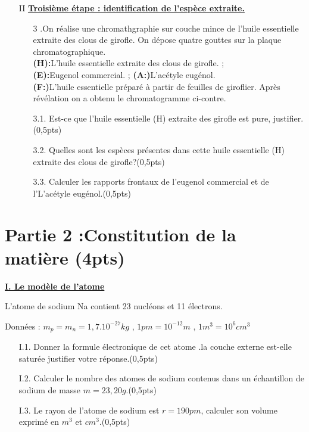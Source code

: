 \documentclass[12pt]{article}
\begin{document}
\begin{enumerate}
\begin{enumerate}
		\end{enumerate}
	\item[II] \underline{\textbf{Troisième étape : identification de l’espèce extraite.}}



		\begin{enumerate}
			\item[3].On réalise une chromathgraphie sur couche mince de l’huile essentielle extraite des clous de girofle. On
dépose quatre gouttes sur la plaque chromatographique.\\\textbf{(H):}L’huile essentielle extraite des clous de girofle. ; 
\\\textbf{(E):}Eugenol commercial. ; \textbf{(A:)}L’acétyle eugénol.
\\\textbf{(F:)}L’huile essentielle préparé à partir de feuilles de giroflier.
Après révélation on a obtenu le chromatogramme ci-contre.

\item[3.1.]Est-ce que l’huile essentielle (H) extraite des girofle est pure, justifier.\dotfill(0,5pts)
\item[3.2.]Quelles sont les espèces présentes dans cette huile essentielle (H) extraite des clous de girofle?\dotfill(0,5pts)

\item[3.3.]Calculer les rapports frontaux de l’eugenol commercial et de l’L’acétyle
eugénol.\dotfill(0,5pts) 
		\end{enumerate}
\end{enumerate}


\section*{Partie 2 :Constitution de la matière \dotfill (4pts) }
\begin{center}
\underline{\textbf{I. Le modèle de l'atome} }
\end{center}
L’atome de sodium Na contient 23 nucléons et 11 électrons.

Données : $m_p = m_n = 1,7.10^{-27}kg$ , $1pm = 10^{-12}m$ , $1m^3  =10^6 cm^3$

\begin{enumerate}
	\item[I.1.]  Donner la formule électronique de cet
atome .la couche externe est-elle saturée
justifier votre réponse.\dotfill(0,5pts)

\item[I.2.] Calculer le nombre des atomes de sodium
contenus dans un échantillon de sodium
de masse $m=23,20g$.\dotfill(0,5pts)
\item[I.3.]  Le rayon de l’atome de sodium est
$r=190pm$, calculer son volume exprimé en $m^3$ et $cm^3$.\dotfill(0,5pts)
\end{enumerate}
\end{document}
